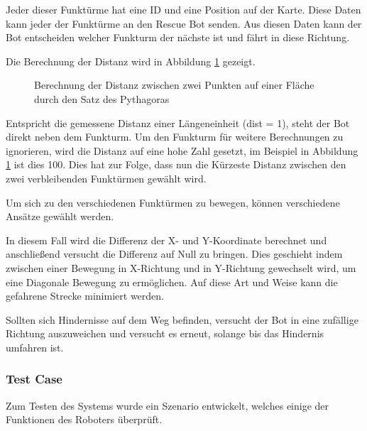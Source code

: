Jeder dieser Funktürme hat eine ID und eine Position auf der Karte. Diese Daten kann jeder der Funktürme an den Rescue Bot senden. Aus diesen Daten kann der Bot entscheiden welcher Funkturm der nächste ist und fährt in diese Richtung. 

Die Berechnung der Distanz wird in Abbildung \ref{dist} gezeigt. 
\begin{figure}[H]
  \caption{Berechnung der Distanz zwischen zwei Punkten auf einer Fläche durch den Satz des Pythagoras}
  \label{dist}
\end{figure}

Entspricht die gemessene Distanz einer Längeneinheit (dist = 1), steht der Bot direkt neben dem Funkturm. Um den Funkturm für weitere Berechnungen zu ignorieren, wird die Distanz auf eine hohe Zahl gesetzt, im Beispiel in Abbildung \ref{dist} ist dies 100. Dies hat zur Folge, dass nun die Kürzeste Distanz zwischen den zwei verbleibenden Funktürmen gewählt wird.

Um sich zu den verschiedenen Funktürmen zu bewegen, können verschiedene Ansätze gewählt werden. 

In diesem Fall wird die Differenz der X- und Y-Koordinate berechnet und anschließend versucht die Differenz auf Null zu bringen. Dies geschieht indem zwischen einer Bewegung in X-Richtung und in Y-Richtung gewechselt wird, um eine Diagonale Bewegung zu ermöglichen. Auf diese Art und Weise kann die gefahrene Strecke minimiert werden. 

Sollten sich Hindernisse auf dem Weg befinden, versucht der Bot in eine zufällige Richtung auszuweichen und versucht es erneut, solange bis das Hindernis umfahren ist.

\subsubsection{Test Case}
\label{test}
Zum Testen des Systems wurde ein Szenario entwickelt, welches einige der Funktionen des Roboters überprüft. 

